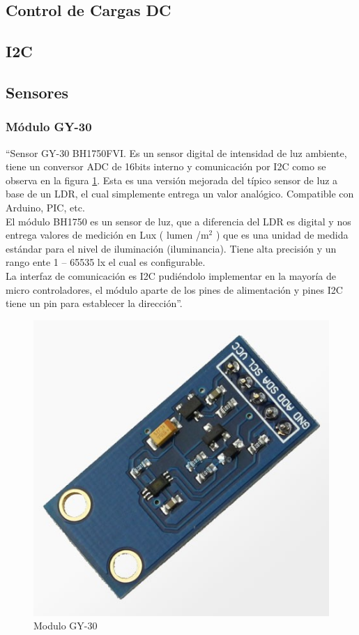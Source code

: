 \subsection{Control de Cargas DC}


\subsection{I2C}

\subsection{Sensores}

\subsubsection{Módulo GY-30}

``Sensor GY-30 BH1750FVI. Es un sensor digital de intensidad de luz ambiente, tiene un conversor ADC de 16bits interno y comunicación por I2C como se observa en la figura \ref{fig:gy-30}. Esta es una versión mejorada del típico sensor de luz a base de un LDR, el cual simplemente entrega un valor analógico. Compatible con Arduino, PIC, etc. \\

El módulo BH1750 es un sensor de luz, que a diferencia del LDR es digital y nos entrega valores de medición en Lux ( lumen /m$^2$ ) que es una  unidad de medida estándar para el nivel de iluminación (iluminancia). Tiene alta precisión y un rango ente 1 – 65535 lx el cual es configurable.\\

La interfaz de comunicación es I2C pudiéndolo implementar en la mayoría de micro controladores, el módulo aparte de los pines de alimentación y pines I2C tiene un pin para establecer la dirección''.\cite{GY30}

\begin{figure}
	\centering
	\caption{Modulo GY-30 \cite{GY30}}
	\label{fig:gy-30}
	\includegraphics[width=0.4\linewidth]{Imagenes/gy-30}
\end{figure}

